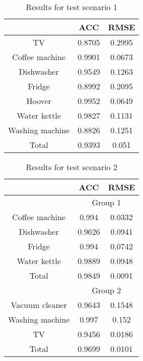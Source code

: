 \documentclass{article}
\begin{document}
\begin{table}
 \centering
 \begin{tabular}{|c|cc|}
\hline
&  \ac{ACC} & \ac{RMSE} \\
\hline
\hline
TV 							& 0.8705	& 0.2995 \\
Coffee machine 				& 0.9901	& 0.0673 	 \\
Dishwasher 					& 0.9549	& 0.1263 \\
Fridge						& 0.8992	& 0.2095 \\
Hoover						& 0.9952	& 0.0649 \\
Water kettle  				& 0.9827	& 0.1131\\
Washing machine				& 0.8826	& 0.1251\\
\hline
\hline
Total						& 0.9393	& 0.051 \\
\hline
\end{tabular}
\caption{Results for test scenario 1}
\label{tab:aggregatedResults}
\end{table}


\begin{table}
 \centering
 \begin{tabular}{|c|cc|}
\hline

&  \ac{ACC} & \ac{RMSE}  \\
\hline
\hline
& \multicolumn{2}{c|}{Group 1} \\
\hline
Coffee machine 			& 0.994		& 0.0332   \\
Dishwasher 				& 0.9626	& 0.0941  \\
Fridge 					& 0.994 	& 0,0742 \\
Water kettle			& 0.9889	& 0.0948 \\
\hline
Total 					& 0.9849	& 0.0091  \\
\hline
\hline
& \multicolumn{2}{c|}{Group 2} \\
\hline
Vacuum cleaner			& 0.9643	& 0.1548  \\
Washing machine  		& 0.997		& 0.152	\\
TV 						& 0.9456	& 0.0186  \\
\hline
\hline
Total 					& 0.9699 & 0.0101  \\
\hline
\end{tabular}
\caption{Results for test scenario 2}
\label{tab:groupedResults}
\end{table}
\end{document}
